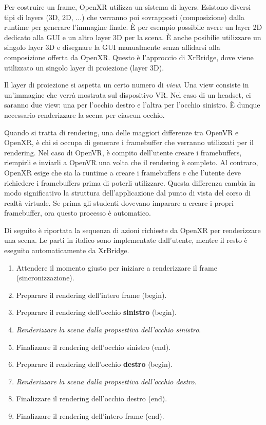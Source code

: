 \documentclass[twoside]{supsistudent}
\begin{document}
Per costruire un frame, OpenXR utilizza un sistema di layers. Esistono diversi tipi di layers (3D, 2D, ...) che verranno poi sovrapposti (composizione) dalla runtime per generare l'immagine finale. È per esempio possibile avere un layer 2D dedicato alla GUI e un altro layer 3D per la scena. È anche posibilie utilizzare un singolo layer 3D e disegnare la GUI manualmente senza affidarsi alla composizione offerta da OpenXR. Questo è l'approccio di XrBridge, dove viene utilizzato un singolo layer di proiezione (layer 3D).

Il layer di proiezione si aspetta un certo numero di \textit{view}. Una view consiste in un'immagine che verrà mostrata sul dispositivo VR. Nel caso di un headset, ci saranno due view: una per l'occhio destro e l'altra per l'occhio sinistro. È dunque necessario renderizzare la scena per ciascun occhio.

Quando si tratta di rendering, una delle maggiori differenze tra OpenVR e OpenXR, è chi si occupa di generare i framebuffer che verranno utilizzati per il rendering. Nel caso  di OpenVR, è compito dell'utente creare i framebuffers, riempirli e inviarli a OpenVR una volta che il rendering è completo. Al contraro, OpenXR esige che sia la runtime a creare i framebuffers e che l'utente deve richiedere i framebuffers prima di poterli utilizzare. Questa differenza cambia in modo significativo la struttura dell'applicazione dal punto di vista del corso di realtà virtuale. Se prima gli studenti dovevano imparare a creare i propri framebuffer, ora questo processo è automatico.

Di seguito è riportata la sequenza di azioni richieste da OpenXR per renderizzare una scena. Le parti in italico sono implementate dall'utente, mentre il resto è eseguito automaticamente da XrBridge.

\begin{enumerate}
  \item Attendere il momento giusto per iniziare a renderizzare il frame (sincronizzazione).
  \item Preparare il rendering dell'intero frame (begin).
  \item Preparare il rendering dell'occhio \textbf{sinistro} (begin).
  \item \textit{Renderizzare la scena dalla propsettiva dell'occhio sinistro}.
  \item Finalizzare il rendering dell'occhio sinistro (end).
  \item Preparare il rendering dell'occhio \textbf{destro} (begin).
  \item \textit{Renderizzare la scena dalla propsettiva dell'occhio destro}.
  \item Finalizzare il rendering dell'occhio destro (end).
  \item Finalizzare il rendering dell'intero frame (end).
\end{enumerate}
\end{document}
